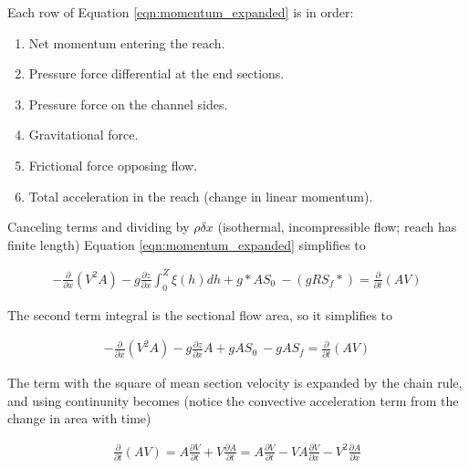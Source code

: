 Each row of  Equation \ref{eqn:momentum_expanded} is in order:
\begin{enumerate}
\item Net momentum entering the reach. 
\item Pressure force differential at the end sections.
\item Pressure force on the channel sides.
\item Gravitational force.
\item Frictional force opposing flow.
\item Total acceleration in the reach (change in linear momentum).
\end{enumerate}

Canceling terms and dividing by $\rho \delta x$ (isothermal, incompressible flow; reach has finite length) Equation \ref{eqn:momentum_expanded} simplifies to 

\begin{equation}
\begin{split}
-\frac{\partial}{\partial x}(V^2A) - g \frac{\partial z}{\partial x}\int_{0}^{Z} \xi(h) dh + g *AS_0~ - ( g R S_f * )  =  \frac{\partial}{\partial t}(AV)
\end{split}
\label{eqn:momentum_simpler}
\end{equation}

The second term integral is the sectional flow area, so it simplifies to 

\begin{equation}
\begin{split}
-\frac{\partial}{\partial x}(V^2A) - g \frac{\partial z}{\partial x}A + gAS_0~ -  g A S_f   =  \frac{\partial}{\partial t}(AV)
\end{split}
\label{eqn:momentum_simpler}
\end{equation}

The term with the square of mean section velocity is expanded by the chain rule, and using continunity becomes (notice the convective acceleration term from the change in area with time)

\begin{equation}
\begin{split}
\frac{\partial}{\partial t}( AV) = A \frac{\partial V }{\partial t} + V \frac{\partial A }{\partial t} = A \frac{\partial V }{\partial t} -VA \frac{ \partial V }{\partial x} - V^2 \frac{\partial A }{\partial x} 
\end{split}
\label{eqn:momentum_simpler1}
\end{equation}

